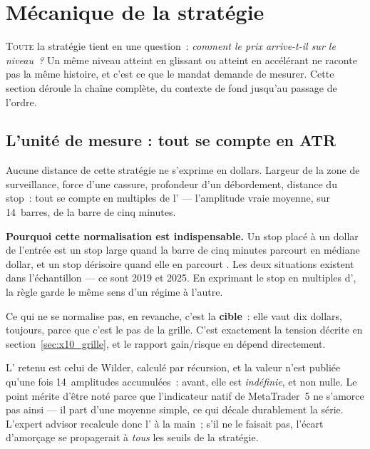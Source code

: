 \section{Mécanique de la stratégie}
\label{sec:x10_mecanique}

\lettrine[lines=2, findent=2pt, nindent=0pt]{T}{oute} la stratégie tient en
une question~: \emph{comment le prix arrive-t-il sur le niveau~?} Un même
niveau atteint en glissant ou atteint en accélérant ne raconte pas la même
histoire, et c'est ce que le mandat demande de mesurer. Cette section déroule
la chaîne complète, du contexte de fond jusqu'au passage de l'ordre.

\subsection{L'unité de mesure : tout se compte en ATR}

Aucune distance de cette stratégie ne s'exprime en dollars. Largeur de la zone
de surveillance, force d'une cassure, profondeur d'un débordement, distance du
stop~: tout se compte en multiples de l' --- l'amplitude vraie
moyenne, sur 14~barres, de la barre de cinq minutes.

\begin{examplebox}
\textbf{Pourquoi cette normalisation est indispensable.} Un stop placé à un
dollar de l'entrée est un stop large quand la barre de cinq minutes parcourt
en médiane \XTenAtrFirst{} dollar, et un stop dérisoire quand elle en parcourt
\XTenAtrLast. Les deux situations existent dans l'échantillon --- ce sont 2019
et 2025. En exprimant le stop en multiples d', la règle garde le
même sens d'un régime à l'autre.

Ce qui ne se normalise pas, en revanche, c'est la \textbf{cible}~: elle vaut
dix dollars, toujours, parce que c'est le pas de la grille. C'est exactement
la tension décrite en section~\ref{sec:x10_grille}, et le rapport gain/risque
en dépend directement.
\end{examplebox}

L' retenu est celui de Wilder, calculé par récursion, et la valeur
n'est publiée qu'une fois 14~amplitudes accumulées~: avant, elle est
\emph{indéfinie}, et non nulle. Le point mérite d'être noté parce que
l'indicateur natif de MetaTrader~5 ne s'amorce pas ainsi --- il part d'une
moyenne simple, ce qui décale durablement la série. L'expert advisor recalcule
donc l' à la main~; s'il ne le faisait pas, l'écart d'amorçage se
propagerait à \emph{tous} les seuils de la stratégie.


